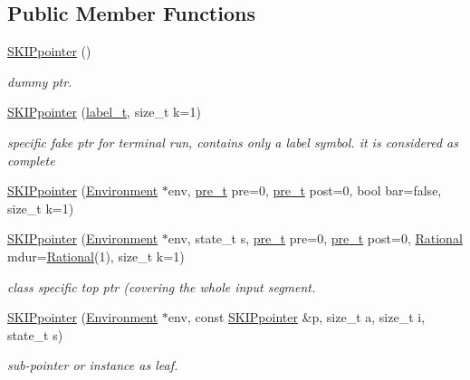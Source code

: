 \subsection*{Public Member Functions}
\begin{DoxyCompactItemize}
\item 
\mbox{\hyperlink{group__table_ga24e762a60a81030599decff93dc1a1ef}{S\+K\+I\+Ppointer}} ()
\begin{DoxyCompactList}\small\item\em dummy ptr. \end{DoxyCompactList}\item 
\mbox{\hyperlink{group__table_ga1fc4cd4038153502277d11c5607a14fa}{S\+K\+I\+Ppointer}} (\mbox{\hyperlink{group__output_ga22fde970e635fcf63962743b2d5c441d}{label\+\_\+t}}, size\+\_\+t k=1)
\begin{DoxyCompactList}\small\item\em specific fake ptr for terminal run, contains only a label symbol. it is considered as complete \end{DoxyCompactList}\item 
\mbox{\hyperlink{group__table_gab217454122f2ec0af5c16bb1ae996925}{S\+K\+I\+Ppointer}} (\mbox{\hyperlink{classEnvironment}{Environment}} $\ast$env, \mbox{\hyperlink{group__general_ga092fe8b972dfa977c2a0886720a7731e}{pre\+\_\+t}} pre=0, \mbox{\hyperlink{group__general_ga092fe8b972dfa977c2a0886720a7731e}{pre\+\_\+t}} post=0, bool bar=false, size\+\_\+t k=1)
\item 
\mbox{\hyperlink{group__table_ga8a29b4e0af8d4fc8d298b7027e4cf638}{S\+K\+I\+Ppointer}} (\mbox{\hyperlink{classEnvironment}{Environment}} $\ast$env, state\+\_\+t s, \mbox{\hyperlink{group__general_ga092fe8b972dfa977c2a0886720a7731e}{pre\+\_\+t}} pre=0, \mbox{\hyperlink{group__general_ga092fe8b972dfa977c2a0886720a7731e}{pre\+\_\+t}} post=0, \mbox{\hyperlink{classRational}{Rational}} mdur=\mbox{\hyperlink{classRational}{Rational}}(1), size\+\_\+t k=1)
\begin{DoxyCompactList}\small\item\em class specific top ptr (covering the whole input segment. \end{DoxyCompactList}\item 
\mbox{\hyperlink{group__table_ga6cd275122aebf4288f5d60c36a141116}{S\+K\+I\+Ppointer}} (\mbox{\hyperlink{classEnvironment}{Environment}} $\ast$env, const \mbox{\hyperlink{classSKIPpointer}{S\+K\+I\+Ppointer}} \&p, size\+\_\+t a, size\+\_\+t i, state\+\_\+t s)
\begin{DoxyCompactList}\small\item\em sub-\/pointer or instance as leaf. \end{DoxyCompactList}\item 

\end{DoxyCompactItemize}

